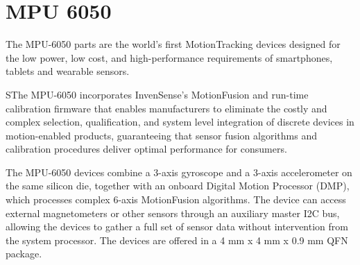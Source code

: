 \chapter{MPU 6050}
\label{chap:SomeStuff}



The MPU-6050 parts are the world’s first MotionTracking devices
designed for the low power, low cost, and high-performance requirements
of smartphones, tablets and wearable sensors.

SThe MPU-6050 incorporates InvenSense’s MotionFusion and run-time
calibration firmware that enables manufacturers to eliminate the costly
and complex selection, qualification, and system level integration of
discrete devices in motion-enabled products, guaranteeing that sensor
fusion algorithms and calibration procedures deliver optimal performance
for consumers.

The MPU-6050 devices combine a 3-axis gyroscope and a 3-axis
accelerometer on the same silicon die, together with an onboard Digital
Motion Processor (DMP), which processes complex 6-axis MotionFusion
algorithms. The device can access external magnetometers or other
sensors through an auxiliary master I2C bus, allowing the devices to
gather a full set of sensor data without intervention from the system
processor. The devices are offered in a 4 mm x 4 mm x 0.9 mm QFN
package.